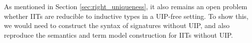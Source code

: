 \documentclass[a4paper,UKenglish,cleveref, autoref]{lipics-v2019}
\begin{document}
As mentioned in Section \ref{sec:right_uniqueness}, it also remains an open
problem whether IITs are reducible to inductive types in a UIP-free setting. To
show this, we would need to construct the syntax of signatures without UIP, and
also reproduce the semantics and term model construction for IITs without UIP.


\end{document}
